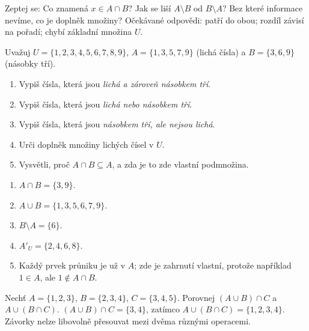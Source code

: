 \documentclass[11pt,a4paper]{article}
\begin{document}
Zeptej se: Co znamená $x\in A\cap B$? Jak se liší $A\setminus B$ od
$B\setminus A$? Bez které informace nevíme, co je doplněk množiny?
Očekávané odpovědi: patří do obou; rozdíl závisí na pořadí; chybí základní
množina $U$.

\begin{zadaniReseniBox}[title={Rozšíření 1}]
Uvažuj $U=\{1,2,3,4,5,6,7,8,9\}$,
$A=\{1,3,5,7,9\}$ (lichá čísla) a
$B=\{3,6,9\}$ (násobky tří).
\begin{enumerate}[label=\alph*)]
\item Vypiš čísla, která jsou \emph{lichá a zároveň násobkem tří}.
\item Vypiš čísla, která jsou \emph{lichá nebo násobkem tří}.
\item Vypiš čísla, která jsou \emph{násobkem tří, ale nejsou lichá}.
\item Urči doplněk množiny lichých čísel v $U$.
\item Vysvětli, proč $A\cap B\subseteq A$, a zda je to zde vlastní
podmnožina.
\end{enumerate}
\tcblower
\begin{enumerate}[label=\alph*)]
\item $A\cap B=\{3,9\}$.
\item $A\cup B=\{1,3,5,6,7,9\}$.
\item $B\setminus A=\{6\}$.
\item $A'_U=\{2,4,6,8\}$.
\item Každý prvek průniku je už v $A$; zde je zahrnutí vlastní,
protože například $1\in A$, ale $1\notin A\cap B$.
\end{enumerate}
\end{zadaniReseniBox}

\begin{zadaniReseniBox}[title={Rozšíření 2}]
Nechť $A=\{1,2,3\}$, $B=\{2,3,4\}$, $C=\{3,4,5\}$.
Porovnej $(A\cup B)\cap C$ a $A\cup(B\cap C)$.
\tcblower
$(A\cup B)\cap C=\{3,4\}$, zatímco
$A\cup(B\cap C)=\{1,2,3,4\}$. Závorky nelze libovolně přesouvat
mezi dvěma různými operacemi.
\end{zadaniReseniBox}
\end{document}

